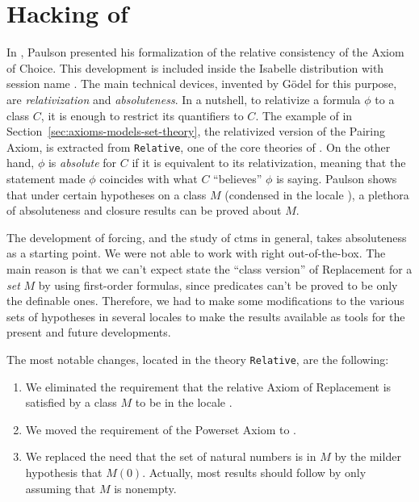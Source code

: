 \section{Hacking of }
\label{sec:hack-constructible}
In \cite{paulson_2003}, Paulson presented his formalization of the
relative consistency of the Axiom of Choice. This development is
included inside the Isabelle distribution with session name
. The main technical devices, invented by
G\"odel for this purpose, are \emph{relativization} and
\emph{absoluteness}. In a nutshell, to relativize a formula $\phi$ to
a class $C$, it is enough to restrict its quantifiers to $C$. The
example of  in
Section~\ref{sec:axioms-models-set-theory}, the relativized version of
the Pairing Axiom, is extracted from \texttt{Relative}, one of the
core theories of . On the other hand, $\phi$
is \emph{absolute} for $C$ if it is equivalent to its relativization,
meaning that the statement made $\phi$ coincides with what $C$
``believes'' $\phi$ is saying. Paulson shows that under certain
hypotheses  on a class $M$ (condensed in the locale ), a plethora of
absoluteness and closure results can be proved about $M$.

The development of forcing, and the study of ctms in general, takes
absoluteness as a starting point. We were not able to work with
 right out-of-the-box. The main reason is that
we can't expect state the ``class version'' of Replacement for a
\emph{set} $M$ by
using first-order formulas, since predicates  can't
be proved to be only the definable ones. Therefore, we had to make
some modifications to the various sets of hypotheses in several
locales to make the results available as tools for the present and
future developments.


The most notable changes, located in the theory \texttt{Relative}, are
the following:
\begin{enumerate}
\item\label{item:1} We eliminated the requirement that the relative Axiom of Replacement
  is satisfied by a class $M$ to be in the locale . 
\item\label{item:2} We moved the requirement of the Powerset Axiom to . 
\item\label{item:3} We replaced the need that the set of natural numbers is in $M$ by the
  milder hypothesis that $M(0)$. Actually, most results should follow
  by only assuming that $M$ is nonempty.
\end{enumerate}

